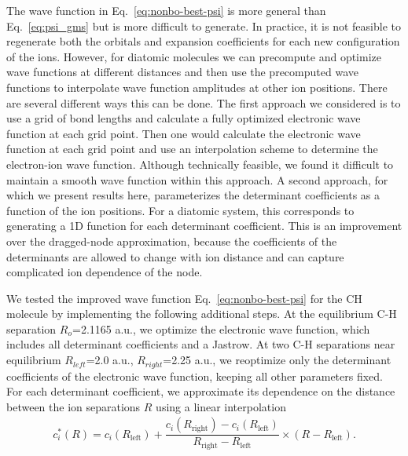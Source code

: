 The wave function in Eq.~\ref{eq:nonbo-best-psi} is more general than Eq.~\ref{eq:psi_gms}
but is more difficult to generate. In practice, it is not feasible to regenerate both the orbitals and expansion coefficients for each new configuration of the ions.
However, for diatomic molecules we can precompute and optimize wave functions at different distances and then use the precomputed wave functions to interpolate wave function amplitudes at other ion positions.
There are several different ways this can be done.
The first approach we considered is to use a grid of bond lengths and calculate a fully optimized electronic wave function at each grid point.
Then one would calculate the electronic wave function at each grid point and use an interpolation scheme to determine the electron-ion wave function.
Although technically feasible, we found it difficult to maintain a smooth wave function within this approach.
A second approach, for which we present results here, parameterizes the
determinant coefficients as a function of the ion positions.
For a diatomic system, this corresponds to generating a 1D function for each determinant coefficient.
This is an improvement over the dragged-node approximation, because the coefficients of the determinants are allowed to change with ion distance and can capture complicated ion dependence of the node.

We tested the improved wave function Eq.~\ref{eq:nonbo-best-psi} for the CH molecule by implementing the following additional steps. At the equilibrium C-H separation $R_o$=2.1165 a.u., we optimize the electronic wave function, which includes all determinant coefficients and a Jastrow. At two C-H separations near equilibrium $R_{left}$=2.0 a.u., $R_{right}$=2.25 a.u., we reoptimize only the determinant coefficients of the electronic wave function, keeping all other parameters fixed. For each determinant coefficient, we approximate its dependence on the distance between the ion separations $R$ using a linear interpolation
\begin{align}
c_i^*(R) = c_i(R_{\text{left}}) + 
\dfrac{c_i(R_{\text{right}}) - c_i(R_{\text{left}})}{R_{\text{right}}-R_{\text{left}}}\times(R-R_{\text{left}}). \label{eq:interpolation}
\end{align}

